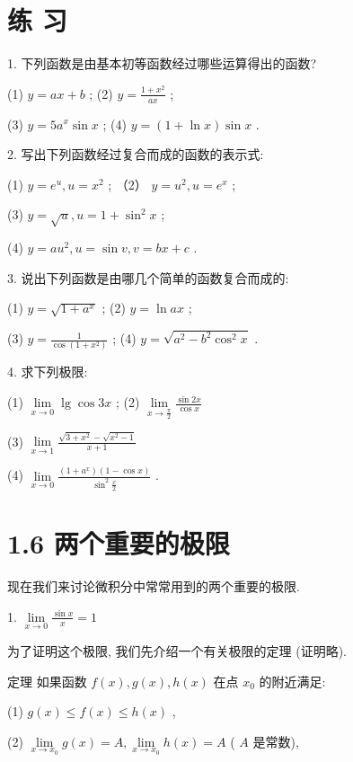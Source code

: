 \documentclass[10pt]{article}
\begin{document}
\section*{练 习}

1. 下列函数是由基本初等函数经过哪些运算得出的函数?

(1) \(y = {ax} + b\) ; (2) \(y = \frac{1 + {x}^{2}}{ax}\) ;

(3) \(y = 5{a}^{x}\sin x\) ; (4) \(y = \left( {1 + \ln x}\right) \sin x\) .

2. 写出下列函数经过复合而成的函数的表示式:

(1) \(y = {e}^{u},u = {x}^{2}\) ; （2） \(y = {u}^{2},u = {e}^{x}\) ;

(3) \(y = \sqrt{u},u = 1 + {\sin }^{2}x\) ;

(4) \(y = a{u}^{2},u = \sin v,v = {bx} + c\) .

3. 说出下列函数是由哪几个简单的函数复合而成的:

(1) \(y = \sqrt{1 + {a}^{x}}\) ; (2) \(y = \ln {ax}\) ;

(3) \(y = \frac{1}{\cos \left( {1 + {x}^{2}}\right) }\) ; (4) \(y = \sqrt{{a}^{2} - {b}^{2}{\cos }^{2}x}\) .

4. 求下列极限:

(1) \(\mathop{\lim }\limits_{{x \rightarrow 0}}\lg \cos {3x}\) ; (2) \(\mathop{\lim }\limits_{{x \rightarrow \frac{\pi }{2}}}\frac{\sin {2x}}{\cos x}\)

(3) \(\mathop{\lim }\limits_{{x \rightarrow 1}}\frac{\sqrt{3 + {x}^{2}} - \sqrt{{x}^{2} - 1}}{x + 1}\)

(4) \(\mathop{\lim }\limits_{{x \rightarrow 0}}\frac{\left( {1 + {a}^{x}}\right) \left( {1 - \cos x}\right) }{{\sin }^{2}\frac{x}{2}}\) .

\section*{1.6 两个重要的极限}

现在我们来讨论微积分中常常用到的两个重要的极限.

1. \(\mathop{\lim }\limits_{{x \rightarrow 0}}\frac{\sin x}{x} = 1\)

为了证明这个极限, 我们先介绍一个有关极限的定理 (证明略).

定理 如果函数 \(f\left( x\right) ,g\left( x\right) ,h\left( x\right)\) 在点 \({x}_{0}\) 的附近满足:

(1) \(g\left( x\right) \leq f\left( x\right) \leq h\left( x\right)\) ,

(2) \(\mathop{\lim }\limits_{{x \rightarrow {x}_{0}}}g\left( x\right) = A,\mathop{\lim }\limits_{{x \rightarrow {x}_{0}}}h\left( x\right) = A\) ( \(A\) 是常数),
\end{document}
